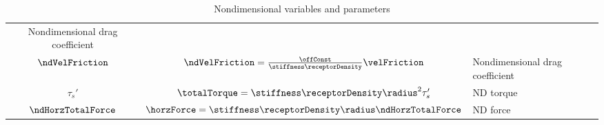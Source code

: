\begin{table}
\begin{tabular}{ccl}
                                                                   Nondimensional
                                                                   drag
                                                                   coefficient
    \\ 
    $\ndVelFriction$ & $\ndVelFriction = \frac{\offConst}{\stiffness
                       \receptorDensity} \velFriction$ &
                                                         Nondimensional
                                                         drag
                                                         coefficient
    \\
    $\tau_s'$ & $\totalTorque = \stiffness \receptorDensity \radius^2
                \tau_s'$ & ND torque \\
    $\ndHorzTotalForce$ & $\horzForce = \stiffness \receptorDensity
                          \radius \ndHorzTotalForce$ & ND force \\
    \bottomrule
  \end{tabular}
  \caption{Nondimensional variables and parameters}
  \label{tab:nd-vars}
\end{table}
